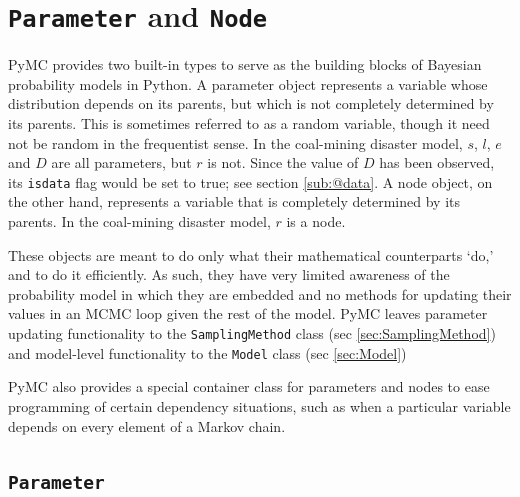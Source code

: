 \documentclass[]{book}
\begin{document}
\section{\texttt{Parameter} and \texttt{Node}}\label{sec:PyMCObjects}
PyMC provides two built-in types to serve as the building blocks of Bayesian probability models in Python. A parameter object represents a variable whose distribution depends on its parents, but which is not completely determined by its parents. This is sometimes referred to as a random variable, though it need not be random in the frequentist sense. In the coal-mining disaster model, $s$, $l$, $e$ and $D$ are all parameters, but $r$ is not. Since the value of $D$ has been observed, its \texttt{isdata} flag would be set to true; see section \ref{sub:@data}. A node object, on the other hand, represents a variable that is completely determined by its parents. In the coal-mining disaster model, $r$ is a node.

These objects are meant to do only what their mathematical counterparts `do,' and to do it efficiently. As such, they have very limited awareness of the probability model in which they are embedded and no methods for updating their values in an MCMC loop given the rest of the model. PyMC leaves parameter updating functionality to the \texttt{SamplingMethod} class (sec \ref{sec:SamplingMethod}) and model-level functionality to the \texttt{Model} class (sec \ref{sec:Model})

PyMC also provides a special container class for parameters and nodes to ease programming of certain dependency situations, such as when a particular variable depends on every element of a Markov chain.

\subsection{\texttt{Parameter}}\label{sub:parameter}
\end{document}
